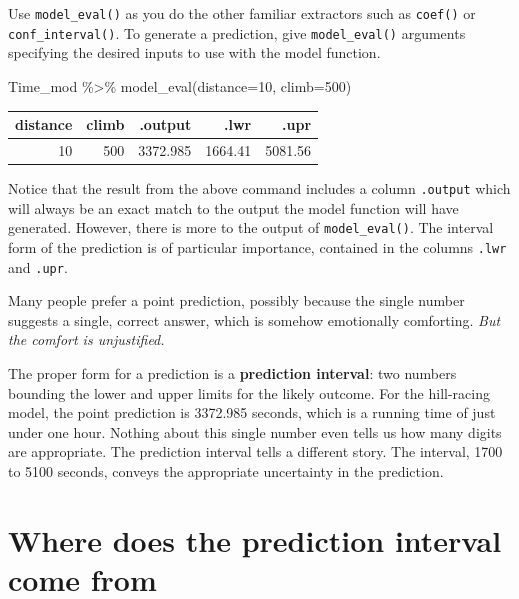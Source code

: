 \documentclass[
  letterpaper,
  DIV=11,
  numbers=noendperiod,
  oneside]{scrreprt}
\newenvironment{Shaded}{\begin{snugshade}}{\end{snugshade}}
\newcommand{\AttributeTok}[1]{\textcolor[rgb]{0.40,0.45,0.13}{#1}}
\newcommand{\DecValTok}[1]{\textcolor[rgb]{0.68,0.00,0.00}{#1}}
\newcommand{\FunctionTok}[1]{\textcolor[rgb]{0.28,0.35,0.67}{#1}}
\newcommand{\NormalTok}[1]{\textcolor[rgb]{0.00,0.23,0.31}{#1}}
\newcommand{\SpecialCharTok}[1]{\textcolor[rgb]{0.37,0.37,0.37}{#1}}
\begin{document}
Use \texttt{model\_eval()} as you do the other familiar extractors such
as \texttt{coef()} or \texttt{conf\_interval()}. To generate a
prediction, give \texttt{model\_eval()} arguments specifying the desired
inputs to use with the model function.

\begin{Shaded}
\begin{Highlighting}[]
\NormalTok{Time\_mod }\SpecialCharTok{\%\textgreater{}\%} \FunctionTok{model\_eval}\NormalTok{(}\AttributeTok{distance=}\DecValTok{10}\NormalTok{, }\AttributeTok{climb=}\DecValTok{500}\NormalTok{) }
\end{Highlighting}
\end{Shaded}

\ttfamily 
\begin{tabular}{rrrrr}
\toprule
distance & climb & .output & .lwr & .upr\\
\midrule
10 & 500 & 3372.985 & 1664.41 & 5081.56\\
\bottomrule
\end{tabular} \normalfont
\bigskip

Notice that the result from the above command includes a column
\texttt{.output} which will always be an exact match to the output the
model function will have generated. However, there is more to the output
of \texttt{model\_eval()}. The interval form of the prediction is of
particular importance, contained in the columns \texttt{.lwr} and
\texttt{.upr}.

Many people prefer a point prediction, possibly because the single
number suggests a single, correct answer, which is somehow emotionally
comforting. \emph{But the comfort is unjustified.}

The proper form for a prediction is a \textbf{prediction interval}: two
numbers bounding the lower and upper limits for the likely outcome. For
the hill-racing model, the point prediction is 3372.985 seconds, which
is a running time of just under one hour. Nothing about this single
number even tells us how many digits are appropriate. The prediction
interval tells a different story. The interval, 1700 to 5100 seconds,
conveys the appropriate uncertainty in the prediction.

\hypertarget{where-does-the-prediction-interval-come-from}{%
\section{Where does the prediction interval come
from}\label{where-does-the-prediction-interval-come-from}}
\end{document}
